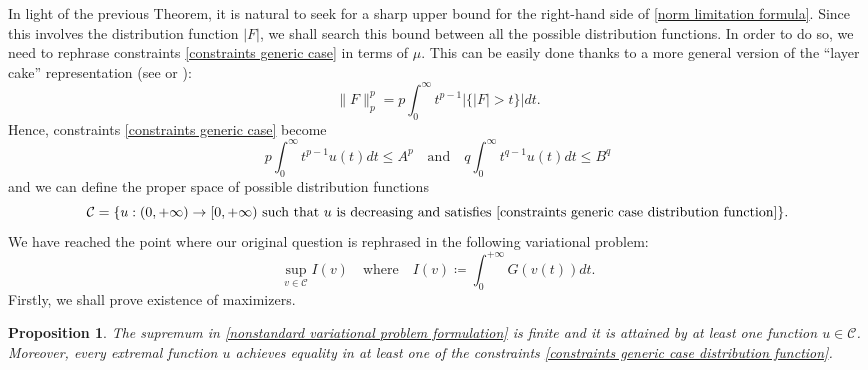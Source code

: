 \documentclass[corpo=11pt, stile=classica, tipotesi=custom,
greek, evenboxes, english]{toptesi}
\numberwithin{equation}{chapter}
\newtheorem{prop}[teo]{Proposition}
\theoremstyle{definition}
\theoremstyle{remark}
\begin{document}
In light of the previous Theorem, it is natural to seek for a sharp upper bound for the right-hand side of \eqref{norm limitation formula}. Since this involves the distribution function $|F|$, we shall search this bound between all the possible distribution functions. In order to do so, we need to rephrase constraints \eqref{constraints generic case} in terms of $\mu$. This can be easily done thanks to a more general version of the ``layer cake'' representation (see \cite[][Theorem 1.13]{liebloss} or \cite[][Proposition 1.1.4]{grafakos}):
\begin{equation*}
	\|F\|_p^p = p \int_0^{\infty} t^{p-1}|\{|F|>t\}|dt.
\end{equation*}
Hence, constraints \eqref{constraints generic case} become
\begin{equation}\label{constraints generic case distribution function}
	p \int_0^{\infty} t^{p-1} u(t)dt \leq A^p \quad \text{and} \quad q \int_0^{\infty} t^{q-1} u(t)dt \leq B^q
\end{equation}
and we can define the proper space of possible distribution functions
\begin{equation}\label{distribution function space}
	\mathcal{C} = \{u : (0,+\infty) \rightarrow [0,+\infty) \text{ such that } u \text{ is decreasing and satisfies } \eqref{constraints generic case distribution function}\}.
\end{equation}
We have reached the point where our original question is rephrased in the following variational problem:
\begin{equation}\label{nonstandard variational problem formulation}
	\sup_{v \in \mathcal{C}} I(v) \quad \text{where} \quad I(v) \coloneqq \int_0^{+\infty} G(v(t))dt.
\end{equation}
Firstly, we shall prove existence of maximizers.
\begin{prop}\label{existence of maximizer}
	The supremum in \eqref{nonstandard variational problem formulation} is finite and it is attained by at least one function $u \in \mathcal{C}$. Moreover, every extremal function $u$ achieves equality in at least one of the constraints \eqref{constraints generic case distribution function}.
\end{prop}
\end{document}
